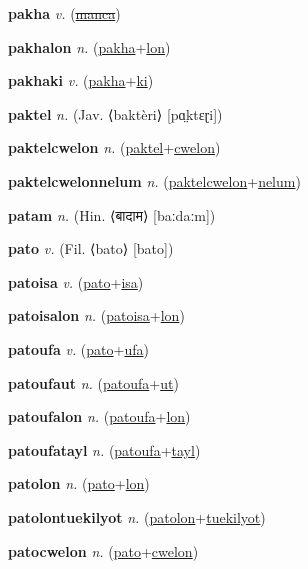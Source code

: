 \textbf{\hypertarget{pakha}{pakha}} \textit{v.} (\hyperlink{manca}{\sout{manca}})


\textbf{\hypertarget{pakhalon}{pakhalon}} \textit{n.} (\hyperlink{pakha}{pakha}+\allowbreak \hyperlink{lon}{lon})


\textbf{\hypertarget{pakhaki}{pakhaki}} \textit{v.} (\hyperlink{pakha}{pakha}+\allowbreak \hyperlink{ki}{ki})


\textbf{\hypertarget{paktel}{paktel}} \textit{n.} (Jav. ⟨baktèri⟩ [pɑ̤ktɛɽi])


\textbf{\hypertarget{paktelcwelon}{paktelcwelon}} \textit{n.} (\hyperlink{paktel}{paktel}+\allowbreak \hyperlink{cwelon}{cwelon})


\textbf{\hypertarget{paktelcwelonnelum}{paktelcwelonnelum}} \textit{n.} (\hyperlink{paktelcwelon}{paktelcwelon}+\allowbreak \hyperlink{nelum}{nelum})


\textbf{\hypertarget{patam}{patam}} \textit{n.} (Hin. ⟨{\devanagari{}बादाम}⟩ [baːdaːm])


\textbf{\hypertarget{pato}{pato}} \textit{v.} (Fil. ⟨bato⟩ [bato])


\textbf{\hypertarget{patoisa}{patoisa}} \textit{v.} (\hyperlink{pato}{pato}+\allowbreak \hyperlink{isa}{isa})


\textbf{\hypertarget{patoisalon}{patoisalon}} \textit{n.} (\hyperlink{patoisa}{patoisa}+\allowbreak \hyperlink{lon}{lon})


\textbf{\hypertarget{patoufa}{patoufa}} \textit{v.} (\hyperlink{pato}{pato}+\allowbreak \hyperlink{ufa}{ufa})


\textbf{\hypertarget{patoufaut}{patoufaut}} \textit{n.} (\hyperlink{patoufa}{patoufa}+\allowbreak \hyperlink{ut}{ut})


\textbf{\hypertarget{patoufalon}{patoufalon}} \textit{n.} (\hyperlink{patoufa}{patoufa}+\allowbreak \hyperlink{lon}{lon})


\textbf{\hypertarget{patoufatayl}{patoufatayl}} \textit{n.} (\hyperlink{patoufa}{patoufa}+\allowbreak \hyperlink{tayl}{tayl})


\textbf{\hypertarget{patolon}{patolon}} \textit{n.} (\hyperlink{pato}{pato}+\allowbreak \hyperlink{lon}{lon})


\textbf{\hypertarget{patolontuekilyot}{patolontuekilyot}} \textit{n.} (\hyperlink{patolon}{patolon}+\allowbreak \hyperlink{tuekilyot}{tuekilyot})


\textbf{\hypertarget{patocwelon}{patocwelon}} \textit{n.} (\hyperlink{pato}{pato}+\allowbreak \hyperlink{cwelon}{cwelon})



